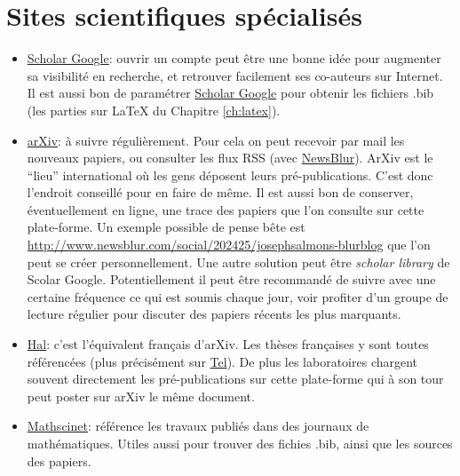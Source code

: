 \section{Sites scientifiques spécialisés}



\begin{itemize}
\item \href{http://scholar.google.com}{Scholar Google}:
ouvrir un compte peut être une bonne idée pour augmenter sa visibilité en recherche,
et retrouver facilement ses co-auteurs sur Internet.
Il est aussi bon de paramétrer \href{http://scholar.google.com}{Scholar Google} pour
obtenir les fichiers  .bib (\lcf les parties sur \LaTeX{} du Chapitre \ref{ch:latex}).

\item \href{http://arxiv.org/}{arXiv}:
\`a suivre régulièrement. Pour cela on peut recevoir par mail les nouveaux papiers, ou consulter les flux RSS (\eg avec 
\href{https://www.newsblur.com/}{NewsBlur}). 
ArXiv est le ``lieu'' international
où les gens déposent leurs pré-publications. C'est donc l'endroit conseillé pour en faire
de même. Il est aussi bon de conserver, éventuellement en ligne, une trace des papiers que
l'on consulte sur cette plate-forme. Un exemple possible de pense bête est 
\href{http://www.newsblur.com/social/202425/josephsalmons-blurblog}
{http://www.newsblur.com/social/202425/josephsalmons-blurblog}
que l'on peut se créer personnellement. Une autre solution peut \^etre 
\textit{scholar library} de Scolar Google. Potentiellement il peut être recommandé de suivre avec une 
certaine fréquence ce qui est soumis
chaque jour, voir profiter d'un groupe de lecture régulier pour discuter des papiers récents les plus
marquants.

\item \href{http://hal.archives-ouvertes.fr/}{Hal}: c'est l'équivalent français d'arXiv.
Les thèses françaises y sont toutes référencées (plus pr\'ecis\'ement sur \href{http://tel.archives-ouvertes.fr/}{Tel}). 
De plus les laboratoires chargent souvent directement
les pré-publications sur cette plate-forme qui \`a son tour peut poster sur arXiv le m\^eme document.


\item \href{http://www.ams.org/mathscinet/}{Mathscinet}: référence les travaux publiés dans
des journaux de mathématiques. Utiles aussi pour trouver des fichies .bib, ainsi que les sources
des papiers. 

\end{itemize}





